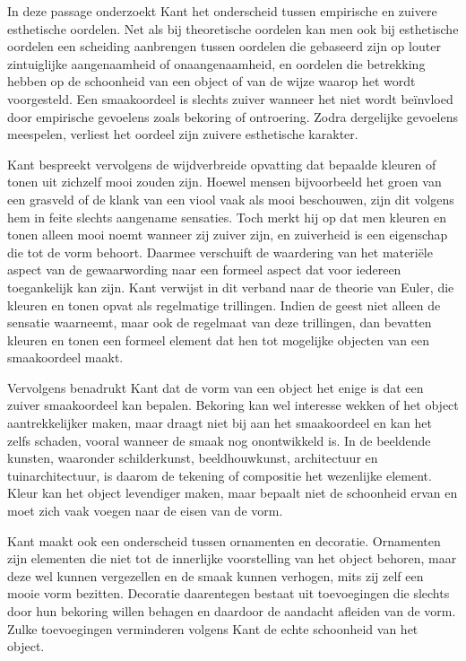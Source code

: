 \begin{mdframed}[leftmargin=0pt,rightmargin=0pt,backgroundcolor=blue!6,linecolor=white,innertopmargin=6pt,innerbottommargin=6pt]
    
In deze passage onderzoekt Kant het onderscheid tussen empirische en zuivere esthetische oordelen. Net als bij theoretische oordelen kan men ook bij esthetische oordelen een scheiding aanbrengen tussen oordelen die gebaseerd zijn op louter zintuiglijke aangenaamheid of onaangenaamheid, en oordelen die betrekking hebben op de schoonheid van een object of van de wijze waarop het wordt voorgesteld. Een smaakoordeel is slechts zuiver wanneer het niet wordt beïnvloed door empirische gevoelens zoals bekoring of ontroering. Zodra dergelijke gevoelens meespelen, verliest het oordeel zijn zuivere esthetische karakter.

Kant bespreekt vervolgens de wijdverbreide opvatting dat bepaalde kleuren of tonen uit zichzelf mooi zouden zijn. Hoewel mensen bijvoorbeeld het groen van een grasveld of de klank van een viool vaak als mooi beschouwen, zijn dit volgens hem in feite slechts aangename sensaties. Toch merkt hij op dat men kleuren en tonen alleen mooi noemt wanneer zij zuiver zijn, en zuiverheid is een eigenschap die tot de vorm behoort. Daarmee verschuift de waardering van het materiële aspect van de gewaarwording naar een formeel aspect dat voor iedereen toegankelijk kan zijn. Kant verwijst in dit verband naar de theorie van Euler, die kleuren en tonen opvat als regelmatige trillingen. Indien de geest niet alleen de sensatie waarneemt, maar ook de regelmaat van deze trillingen, dan bevatten kleuren en tonen een formeel element dat hen tot mogelijke objecten van een smaakoordeel maakt.

Vervolgens benadrukt Kant dat de vorm van een object het enige is dat een zuiver smaakoordeel kan bepalen. Bekoring kan wel interesse wekken of het object aantrekkelijker maken, maar draagt niet bij aan het smaakoordeel en kan het zelfs schaden, vooral wanneer de smaak nog onontwikkeld is. In de beeldende kunsten, waaronder schilderkunst, beeldhouwkunst, architectuur en tuinarchitectuur, is daarom de tekening of compositie het wezenlijke element. Kleur kan het object levendiger maken, maar bepaalt niet de schoonheid ervan en moet zich vaak voegen naar de eisen van de vorm.

Kant maakt ook een onderscheid tussen ornamenten en decoratie. Ornamenten zijn elementen die niet tot de innerlijke voorstelling van het object behoren, maar deze wel kunnen vergezellen en de smaak kunnen verhogen, mits zij zelf een mooie vorm bezitten. Decoratie daarentegen bestaat uit toevoegingen die slechts door hun bekoring willen behagen en daardoor de aandacht afleiden van de vorm. Zulke toevoegingen verminderen volgens Kant de echte schoonheid van het object.


\end{mdframed}
